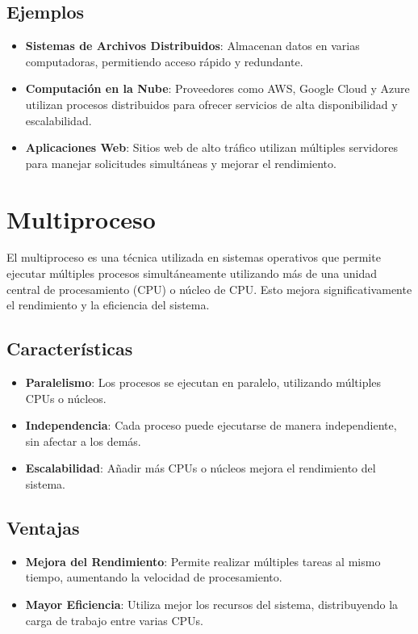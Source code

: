 \subsection{Ejemplos}
\begin{itemize}
	\item \textbf{Sistemas de Archivos Distribuidos}: Almacenan datos en varias computadoras, permitiendo acceso rápido y redundante.
	\item \textbf{Computación en la Nube}: Proveedores como AWS, Google Cloud y Azure utilizan procesos distribuidos para ofrecer servicios de alta disponibilidad y escalabilidad.
	\item \textbf{Aplicaciones Web}: Sitios web de alto tráfico utilizan múltiples servidores para manejar solicitudes simultáneas y mejorar el rendimiento.
\end{itemize}

\section{Multiproceso}
El multiproceso es una técnica utilizada en sistemas operativos que permite ejecutar múltiples procesos simultáneamente utilizando más de una unidad central de procesamiento (CPU) o núcleo de CPU. Esto mejora significativamente el rendimiento y la eficiencia del sistema.

\subsection{Características}
\begin{itemize}
	\item \textbf{Paralelismo}: Los procesos se ejecutan en paralelo, utilizando múltiples CPUs o núcleos.
	\item \textbf{Independencia}: Cada proceso puede ejecutarse de manera independiente, sin afectar a los demás.
	\item \textbf{Escalabilidad}: Añadir más CPUs o núcleos mejora el rendimiento del sistema.
\end{itemize}

\subsection{Ventajas}
\begin{itemize}
	\item \textbf{Mejora del Rendimiento}: Permite realizar múltiples tareas al mismo tiempo, aumentando la velocidad de procesamiento.
	\item \textbf{Mayor Eficiencia}: Utiliza mejor los recursos del sistema, distribuyendo la carga de trabajo entre varias CPUs.
\end{itemize}


